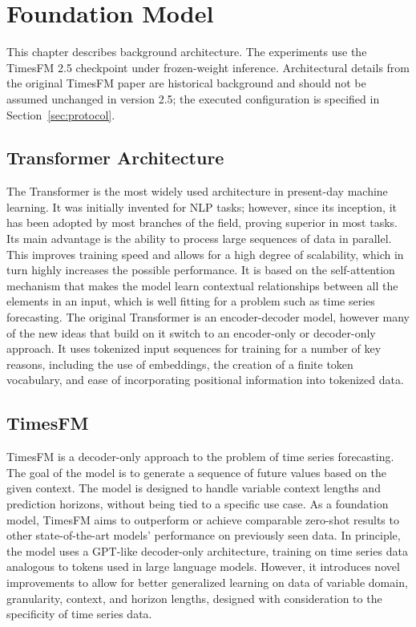 \newpage
\section{Foundation Model}

This chapter describes background architecture. The experiments use the TimesFM 2.5 checkpoint under frozen-weight inference. Architectural details from the original TimesFM paper are historical background and should not be assumed unchanged in version 2.5; the executed configuration is specified in Section~\ref{sec:protocol}.\cite{timesfm_paper,timesfm_card}

\subsection {Transformer Architecture}

The Transformer is the most widely used architecture in present-day machine learning. It was initially invented for NLP tasks; however, since its inception, it has been adopted by most branches of the field, proving superior in most tasks. Its main advantage is the ability to process large sequences of data in parallel. This improves training speed and allows for a high degree of scalability, which in turn highly increases the possible performance. It is based on the self-attention mechanism that makes the model learn contextual relationships between all the elements in an input, which is well fitting for a problem such as time series forecasting. The original Transformer is an encoder-decoder model, however many of the new ideas that build on it switch to an encoder-only or decoder-only approach. It uses tokenized input sequences for training for a number of key reasons, including the use of embeddings, the creation of a finite token vocabulary, and ease of incorporating positional information into tokenized data.

\subsection{TimesFM}

TimesFM is a decoder-only approach to the problem of time series forecasting. The goal of the model is to generate a sequence of future values based on the given context. The model is designed to handle variable context lengths and prediction horizons, without being tied to a specific use case. As a foundation model, TimesFM aims to outperform or achieve comparable zero-shot results to other state-of-the-art models’ performance on previously seen data. In principle, the model uses a GPT-like decoder-only architecture, training on time series data analogous to tokens used in large language models. However, it introduces novel improvements to allow for better generalized learning on data of variable domain, granularity, context, and horizon lengths, designed with consideration to the specificity of time series data.

